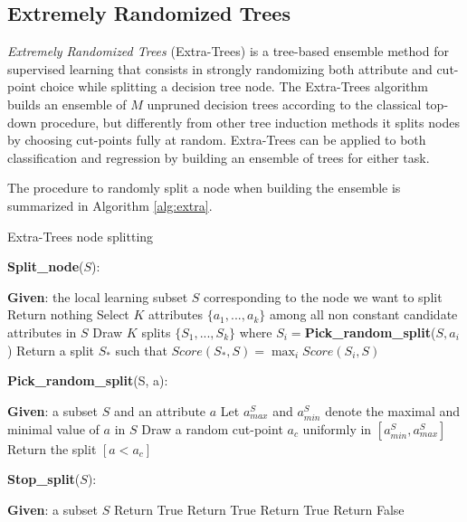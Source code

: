 
\subsection{Extremely Randomized Trees}\label{s:extra-trees}
\textit{Extremely Randomized Trees} (Extra-Trees) \cite{geurts2006extremely}
is a tree-based ensemble method for supervised learning that consists in 
strongly randomizing both attribute and cut-point choice while splitting a 
decision tree node. 
The Extra-Trees algorithm builds an ensemble of $M$ unpruned decision trees 
according to the classical top-down procedure, but differently from other tree 
induction methods it splits nodes by choosing cut-points fully at random. 
Extra-Trees can be applied to both classification and regression by building 
an ensemble of trees for either task.

The procedure to randomly split a node when building the ensemble is summarized 
in Algorithm \ref{alg:extra}.
%
\begin{algorithm}
    \caption{Extra-Trees node splitting}
    \label{alg:extra}
    \begin{algorithmic}
	\STATE \textbf{Split\_node}($S$):
	    \begin{ALC@g}
		\STATE \textbf{Given}: the local learning subset $S$ corresponding to the node we want to split
		    \STATE Return nothing
		\ELSE{} 
		    \STATE Select $K$ attributes $\{a_1, ..., a_k\}$ among all non constant candidate attributes in $S$
		    \STATE Draw $K$ splits $\{S_1, ..., S_k\}$ where $S_i=$\textbf{Pick\_random\_split}($S, a_i$)
		    \STATE Return a split $S_*$ such that $Score(S_*, S)=\max_{i}Score(S_i, S)$
		\ENDIF
	    \end{ALC@g}
	\STATE
	\STATE \textbf{Pick\_random\_split}(S, a):
	    \begin{ALC@g}
		\STATE \textbf{Given}: a subset $S$ and an attribute $a$
		\STATE Let $a_{max}^S$ and $a_{min}^S$ denote the maximal and minimal value of $a$ in $S$
		\STATE Draw a random cut-point $a_c$ uniformly in $[a_{min}^S, a_{max}^S]$
		\STATE Return the split $[a < a_c]$
	    \end{ALC@g}
	\STATE
	\STATE \textbf{Stop\_split}($S$):
	    \begin{ALC@g}
		\STATE \textbf{Given}: a subset $S$
		 \STATE Return True \ENDIF
		 \STATE Return True \ENDIF
		 \STATE Return True \ENDIF
		\STATE Return False
	    \end{ALC@g}
    \end{algorithmic}
\end{algorithm}
%

